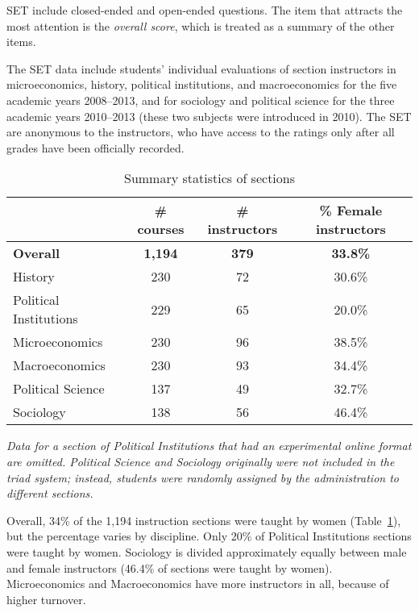 \documentclass[12pt]{article}
\begin{document}
SET include closed-ended and open-ended questions.
The item that attracts the most attention is the \emph{overall score}, 
which is treated as a summary of the other items.

The SET data include students' individual evaluations of section
instructors in microeconomics, history, political institutions, and 
macroeconomics for the five academic years 2008--2013, and for 
sociology and political science for the three academic years 2010--2013 
(these two subjects were introduced in 2010). 
The SET are anonymous to the instructors, who have access to the ratings only after 
all grades have been officially recorded.  

\begin{table}[htbp]
  \centering
  \footnotesize 
  \caption{Summary statistics of sections}
    \begin{tabular}{lccc}
    \toprule 
                        & \# courses & \# instructors  & \% Female instructors  \\
   \midrule
  \textbf{Overall} &  \textbf{1,194} & \textbf{379}  &\textbf{33.8\%} \\
    History    &               230 &      72          &   30.6\% \\
    Political Institutions  &  229 &      65          &   20.0\% \\    
    Microeconomics   &         230 &      96          &   38.5\% \\
    Macroeconomics   &         230 &      93          &   34.4\% \\
    Political Science &       137 &      49          &   32.7\% \\
    Sociology   &              138 &      56          &   46.4\%    \\
    \bottomrule
    \end{tabular}%
 \label{tab:description}%
 
\textit{Data for a section of Political Institutions that 
had an experimental online format are omitted.
Political Science and Sociology originally were not included in the triad system; 
instead, students were randomly assigned by the administration to different sections.
} 

\end{table}%
\normalsize
Overall, 34\% of the 1,194 instruction sections were taught by women 
(Table~\ref{tab:description}), but the percentage varies by discipline. 
Only 20\% of Political Institutions sections were taught by women. 
Sociology is divided approximately equally between male and female instructors 
(46.4\% of sections were taught by women). 
Microeconomics and Macroeconomics have more instructors in all, because of higher turnover.
\end{document}
